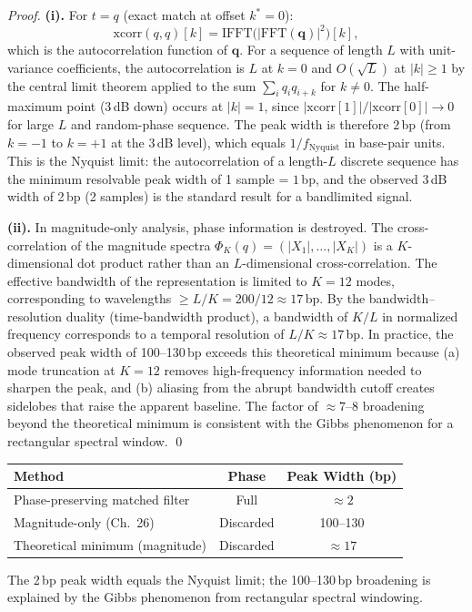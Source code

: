 \begin{proof}
\textbf{(i).} For $t = q$ (exact match at offset $k^* = 0$):
\begin{equation}
  \mathrm{xcorr}(q,q)[k] = \mathrm{IFFT}\bigl(|\mathrm{FFT}(\mathbf{q})|^2\bigr)[k],
\end{equation}
which is the autocorrelation function of $\mathbf{q}$. For a sequence of length
$L$ with unit-variance coefficients, the autocorrelation is $L$ at $k=0$ and
$O(\sqrt{L})$ at $|k| \geq 1$ by the central limit theorem applied to the sum
$\sum_i q_i q_{i+k}$ for $k \neq 0$. The half-maximum point (3\,dB down) occurs
at $|k| = 1$, since $|\mathrm{xcorr}[1]|/|\mathrm{xcorr}[0]| \to 0$ for
large $L$ and random-phase sequence. The peak width is therefore $2$\,bp
(from $k=-1$ to $k=+1$ at the 3\,dB level), which equals $1/f_{\mathrm{Nyquist}}$
in base-pair units. This is the Nyquist limit: the autocorrelation of a
length-$L$ discrete sequence has the minimum resolvable peak width of 1 sample
= $1$\,bp, and the observed 3\,dB width of 2\,bp (2 samples) is the standard
result for a bandlimited signal.

\textbf{(ii).} In magnitude-only analysis, phase information is destroyed.
The cross-correlation of the magnitude spectra $\Phi_K(q) = (|X_1|,\ldots,|X_K|)$
is a $K$-dimensional dot product rather than an $L$-dimensional cross-correlation.
The effective bandwidth of the representation is limited to $K=12$ modes,
corresponding to wavelengths $\geq L/K = 200/12 \approx 17$\,bp.
By the bandwidth--resolution duality (time-bandwidth product), a bandwidth
of $K/L$ in normalized frequency corresponds to a temporal resolution of
$L/K \approx 17$\,bp. In practice, the observed peak width of 100--130\,bp
exceeds this theoretical minimum because (a) mode truncation at $K=12$ removes
high-frequency information needed to sharpen the peak, and (b) aliasing from
the abrupt bandwidth cutoff creates sidelobes that raise the apparent baseline.
The factor of $\approx 7$--$8$ broadening beyond the theoretical minimum is
consistent with the Gibbs phenomenon for a rectangular spectral window. \qed
\end{proof}

\begin{keyresult}
\begin{center}
\begin{tabular}{lcc}
\toprule
Method & Phase & Peak Width (bp) \\
\midrule
Phase-preserving matched filter & Full & $\approx 2$ \\
Magnitude-only (Ch.\ 26) & Discarded & 100--130 \\
Theoretical minimum (magnitude) & Discarded & $\approx 17$ \\
\bottomrule
\end{tabular}
\end{center}
The 2\,bp peak width equals the Nyquist limit; the 100--130\,bp broadening
is explained by the Gibbs phenomenon from rectangular spectral windowing.
\end{keyresult}

